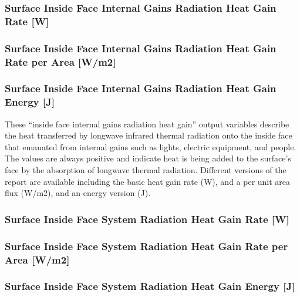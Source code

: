 \subsubsection{Surface Inside Face Internal Gains Radiation Heat Gain Rate {[}W{]}}\label{surface-inside-face-internal-gains-radiation-heat-gain-rate-w}

\subsubsection{Surface Inside Face Internal Gains Radiation Heat Gain Rate per Area {[}W/m2{]}}\label{surface-inside-face-internal-gains-radiation-heat-gain-rate-per-area-wm2}

\subsubsection{Surface Inside Face Internal Gains Radiation Heat Gain Energy {[}J{]}}\label{surface-inside-face-internal-gains-radiation-heat-gain-energy-j}

These ``inside face internal gains radiation heat gain'' output variables describe the heat transferred by longwave infrared thermal radiation onto the inside face that emanated from internal gains such as lights, electric equipment, and people. The values are always positive and indicate heat is being added to the surface's face by the absorption of longwave thermal radiation. Different versions of the report are available including the basic heat gain rate (W), and a per unit area flux (W/m2), and an energy version (J).

\subsubsection{Surface Inside Face System Radiation Heat Gain Rate {[}W{]}}\label{surface-inside-face-system-radiation-heat-gain-rate-w}

\subsubsection{Surface Inside Face System Radiation Heat Gain Rate per Area {[}W/m2{]}}\label{surface-inside-face-system-radiation-heat-gain-rate-per-area-wm2}

\subsubsection{Surface Inside Face System Radiation Heat Gain Energy {[}J{]}}\label{surface-inside-face-system-radiation-heat-gain-energy-j}

